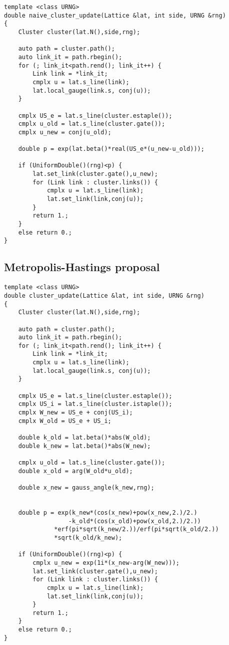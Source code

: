 \begin{lstlisting}[caption={Metropolis cluster update}]
template <class URNG>
double naive_cluster_update(Lattice &lat, int side, URNG &rng)
{
    Cluster cluster(lat.N(),side,rng);

    auto path = cluster.path();
    auto link_it = path.rbegin();
    for (; link_it<path.rend(); link_it++) {
        Link link = *link_it;
        cmplx u = lat.s_line(link);
        lat.local_gauge(link.s, conj(u));
    }

    cmplx US_e = lat.s_line(cluster.estaple());
    cmplx u_old = lat.s_line(cluster.gate());
    cmplx u_new = conj(u_old);

    double p = exp(lat.beta()*real(US_e*(u_new-u_old)));

    if (UniformDouble()(rng)<p) {
        lat.set_link(cluster.gate(),u_new);
        for (Link link : cluster.links()) {
            cmplx u = lat.s_line(link);
            lat.set_link(link,conj(u));
        }
        return 1.;
    }
    else return 0.;
}
\end{lstlisting}

\subsection*{Metropolis-Hastings proposal}
\begin{lstlisting}[caption={Metropolis-Hastings cluster update}]
template <class URNG>
double cluster_update(Lattice &lat, int side, URNG &rng)
{
    Cluster cluster(lat.N(),side,rng);

    auto path = cluster.path();
    auto link_it = path.rbegin();
    for (; link_it<path.rend(); link_it++) {
        Link link = *link_it;
        cmplx u = lat.s_line(link);
        lat.local_gauge(link.s, conj(u));
    }
    
    cmplx US_e = lat.s_line(cluster.estaple());
    cmplx US_i = lat.s_line(cluster.istaple());
    cmplx W_new = US_e + conj(US_i);
    cmplx W_old = US_e + US_i;
    
    double k_old = lat.beta()*abs(W_old);
    double k_new = lat.beta()*abs(W_new);

    cmplx u_old = lat.s_line(cluster.gate());
    double x_old = arg(W_old*u_old);
    
    double x_new = gauss_angle(k_new,rng);
    

    double p = exp(k_new*(cos(x_new)+pow(x_new,2.)/2.)
                  -k_old*(cos(x_old)+pow(x_old,2.)/2.))
              *erf(pi*sqrt(k_new/2.))/erf(pi*sqrt(k_old/2.))
              *sqrt(k_old/k_new);
    
    if (UniformDouble()(rng)<p) {
        cmplx u_new = exp(1i*(x_new-arg(W_new)));
        lat.set_link(cluster.gate(),u_new);
        for (Link link : cluster.links()) {
            cmplx u = lat.s_line(link);
            lat.set_link(link,conj(u));
        }
        return 1.;
    }
    else return 0.;
}
\end{lstlisting}


